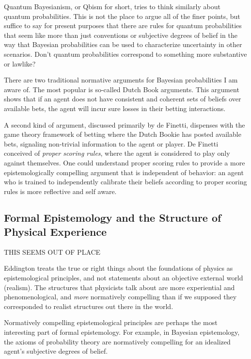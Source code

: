 Quantum Bayesianism, or Qbism for short, tries to think similarly about quantum probabilities.  This is not the place to argue all of the finer points, but suffice to say for present purposes that there are rules for quantum probabilities that seem like more than just conventions or subjective degrees of belief in the way that Bayesian probabilities can be used to characterize uncertainty in other scenarios.  Don't quantum probabilities correspond to something more substantive or lawlike?

There are two traditional normative arguments for Bayesian probabilities I am aware of.  The most popular is so-called Dutch Book arguments.  This argument shows that if an agent does not have consistent and coherent sets of beliefs over available bets, the agent will incur sure losses in their betting interactions.

A second kind of argument, discussed primarily by de Finetti, dispenses with the game theory framework of betting where the Dutch Bookie has posted available bets, signaling non-trivial information to the agent or player.  De Finetti conceived of \emph{proper scoring rules}, where the agent is considered to play only against themselves.  One could understand proper scoring rules to provide a more epistemologically compelling argument that is independent of behavior: an agent who is trained to independently calibrate their beliefs according to proper scoring rules is more reflective and self aware.  

\subsection{Formal Epistemology and the Structure of Physical Experience}

THIS SEEMS OUT OF PLACE

Eddington treats the true or right things about the foundations of physics as epistemological principles, and not statements about an objective external world (realism).  The structures that physicists talk about are more experiential and phenomenological, and \emph{more} normatively compelling than if we supposed they corresponded to realist structures out there in the world.  

Normatively compelling epistemological principles are perhaps the most interesting part of formal epistemology.  For example, in Bayesian epistemology, the axioms of probability theory are normatively compelling for an idealized agent's subjective degrees of belief.  







